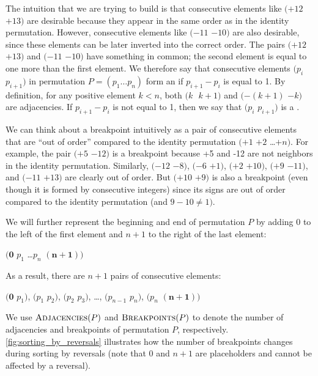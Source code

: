 The intuition that we are trying to build is that consecutive elements like $(+12$ $+13)$ are desirable because they appear in the same order as in the identity permutation.  However, consecutive elements like $(-11$ $-10)$ are also desirable, since these elements can be later inverted into the correct order.  The pairs $(+12$ $+13)$  and $(-11$ $-10)$ have something in common; the second element is equal to one more than the first element. We therefore say that consecutive elements $(p_i$ $p_{i+1})$ in permutation $P = (p_1 \ldots p_n)$ form an  if $p_{i+1} - p_i$  is equal to 1.  By definition, for any positive element $k < n$, both $(k$~\,$k+1)$ and $(-(k+1)$ $-k)$ are adjacencies. If $p_{i+1} - p_i$  is not equal to 1, then we say that $(p_i$ $p_{i+1})$ is a .

We can think about a breakpoint intuitively as a pair of consecutive elements that are ``out of order'' compared to the identity permutation $(+1$ $+2$ \ldots $+n)$.  For example, the pair $(+5$ $-12)$ is a breakpoint because +5 and -12 are not neighbors in the identity permutation. Similarly, $(-12$ $-8)$, $(-6$ $+1)$, $(+2$ $+10)$, $(+9$ $-11)$, and $(-11$ $+13)$ are clearly out of order. But $(+10$ $+9)$ is also a breakpoint (even though it is formed by consecutive integers) since its signs are out of order compared to the identity permutation (and $9-10 \neq 1)$.

We will further represent the beginning and end of permutation $P$ by adding 0 to the left of the first element and $n+1$ to the right of the last element:

\begin{center}
$(\boldsymbol{0}$ $p_1$ \ldots $p_n$ $\boldsymbol{(n+1)})$
\end{center}

\noindent As a result, there are $n+1$ pairs of consecutive elements:

\begin{center}
$(\boldsymbol{0}$ $p_1)$, $(p_1$ $p_2)$, $(p_2$ $p_3)$, \ldots, $(p_{n-1}$ $p_{n})$, $(p_n$ $\boldsymbol{(n+1)})$
\end{center}

\noindent We use $\text{\scshape Adjacencies}(P)$ and $\text{\scshape Breakpoints}(P)$ to denote the number of adjacencies and breakpoints of permutation $P$, respectively.  \autoref{fig:sorting_by_reversals} illustrates how the number of breakpoints changes during sorting by reversals (note that 0 and $n+1$ are placeholders and cannot be affected by a reversal).


